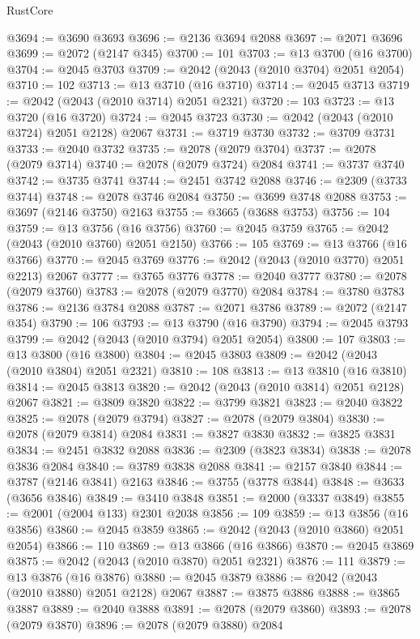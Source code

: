 \begin{lexlean}{RustCore}
\begin{coremodule}
@3694 := @3690 @3693
@3696 := @2136 @3694 @2088
@3697 := @2071 @3696
@3699 := @2072 (@2147 @345)
@3700 := 101
@3703 := @13 @3700 (@16 @3700)
@3704 := @2045 @3703
@3709 := @2042 (@2043 (@2010 @3704) @2051 @2054)
@3710 := 102
@3713 := @13 @3710 (@16 @3710)
@3714 := @2045 @3713
@3719 := @2042 (@2043 (@2010 @3714) @2051 @2321)
@3720 := 103
@3723 := @13 @3720 (@16 @3720)
@3724 := @2045 @3723
@3730 := @2042 (@2043 (@2010 @3724) @2051 @2128) @2067
@3731 := @3719 @3730
@3732 := @3709 @3731
@3733 := @2040 @3732
@3735 := @2078 (@2079 @3704)
@3737 := @2078 (@2079 @3714)
@3740 := @2078 (@2079 @3724) @2084
@3741 := @3737 @3740
@3742 := @3735 @3741
@3744 := @2451 @3742 @2088
@3746 := @2309 (@3733 @3744)
@3748 := @2078 @3746 @2084
@3750 := @3699 @3748 @2088
@3753 := @3697 (@2146 @3750) @2163
@3755 := @3665 (@3688 @3753)
@3756 := 104
@3759 := @13 @3756 (@16 @3756)
@3760 := @2045 @3759
@3765 := @2042 (@2043 (@2010 @3760) @2051 @2150)
@3766 := 105
@3769 := @13 @3766 (@16 @3766)
@3770 := @2045 @3769
@3776 := @2042 (@2043 (@2010 @3770) @2051 @2213) @2067
@3777 := @3765 @3776
@3778 := @2040 @3777
@3780 := @2078 (@2079 @3760)
@3783 := @2078 (@2079 @3770) @2084
@3784 := @3780 @3783
@3786 := @2136 @3784 @2088
@3787 := @2071 @3786
@3789 := @2072 (@2147 @354)
@3790 := 106
@3793 := @13 @3790 (@16 @3790)
@3794 := @2045 @3793
@3799 := @2042 (@2043 (@2010 @3794) @2051 @2054)
@3800 := 107
@3803 := @13 @3800 (@16 @3800)
@3804 := @2045 @3803
@3809 := @2042 (@2043 (@2010 @3804) @2051 @2321)
@3810 := 108
@3813 := @13 @3810 (@16 @3810)
@3814 := @2045 @3813
@3820 := @2042 (@2043 (@2010 @3814) @2051 @2128) @2067
@3821 := @3809 @3820
@3822 := @3799 @3821
@3823 := @2040 @3822
@3825 := @2078 (@2079 @3794)
@3827 := @2078 (@2079 @3804)
@3830 := @2078 (@2079 @3814) @2084
@3831 := @3827 @3830
@3832 := @3825 @3831
@3834 := @2451 @3832 @2088
@3836 := @2309 (@3823 @3834)
@3838 := @2078 @3836 @2084
@3840 := @3789 @3838 @2088
@3841 := @2157 @3840
@3844 := @3787 (@2146 @3841) @2163
@3846 := @3755 (@3778 @3844)
@3848 := @3633 (@3656 @3846)
@3849 := @3410 @3848
@3851 := @2000 (@3337 @3849)
@3855 := @2001 (@2004 @133) @2301 @2038
@3856 := 109
@3859 := @13 @3856 (@16 @3856)
@3860 := @2045 @3859
@3865 := @2042 (@2043 (@2010 @3860) @2051 @2054)
@3866 := 110
@3869 := @13 @3866 (@16 @3866)
@3870 := @2045 @3869
@3875 := @2042 (@2043 (@2010 @3870) @2051 @2321)
@3876 := 111
@3879 := @13 @3876 (@16 @3876)
@3880 := @2045 @3879
@3886 := @2042 (@2043 (@2010 @3880) @2051 @2128) @2067
@3887 := @3875 @3886
@3888 := @3865 @3887
@3889 := @2040 @3888
@3891 := @2078 (@2079 @3860)
@3893 := @2078 (@2079 @3870)
@3896 := @2078 (@2079 @3880) @2084

\end{coremodule}
\end{lexlean}

